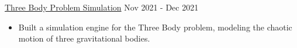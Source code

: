 \documentclass[9pt]{resume}
\begin{document}
\begin{experiencelist}
        \experiencenocompany
            {\href{https://github.com/TheSharkhead2/third_body_simulation}{Three Body Problem Simulation}}
            {Nov 2021 - Dec 2021}
            {\begin{itemize}[noitemsep, topsep=1pt]
                \item Built a simulation engine for the Three Body problem, modeling the chaotic motion of three gravitational bodies. 
            \end{itemize}}
    \end{experiencelist}
    \vspace{-0.2cm}
\end{document}
